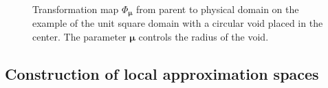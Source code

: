\documentclass[a4paper]{eccomas_paper-2024}
\begin{document}
\begin{figure}
    \centering
    
    \caption{Transformation map $\Phi_{\bm\mu}$ from parent to physical domain on the example of the unit square domain with a circular void placed in the center. The parameter $\bm\mu$ controls the radius of the void.}\label{fig:transformationmap}
\end{figure}



\subsection{Construction of local approximation spaces} %
\label{sub:Construction of local approximation spaces}

\end{document}
